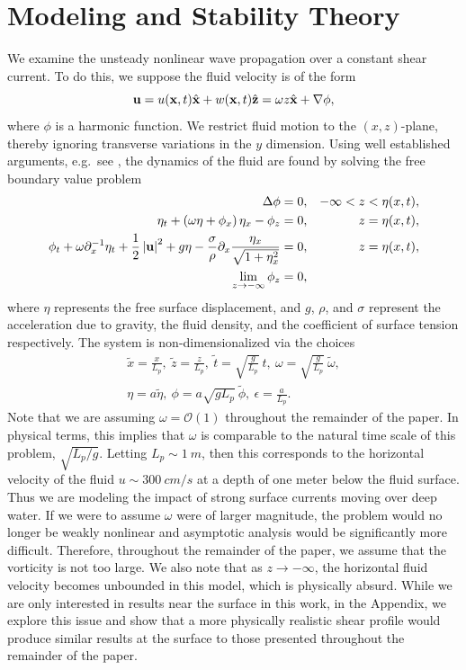 \documentclass[a4paper,11pt]{article}
\newcommand{\pd}{\partial}
\begin{document}
\section{Modeling and Stability Theory}
We examine the unsteady nonlinear wave propagation over a constant shear current.  To do this, we suppose the fluid velocity is of the form
\[
{\bf u} = u({\bf x},t)\hat{{\bf x}} + w({\bf x},t)\hat{{\bf z}} = \omega z\hat{{\bf x}} + \nabla \phi,
\]
where $\phi$ is a harmonic function.  We restrict fluid motion to the $(x,z)$-plane, thereby ignoring transverse variations in the $y$ dimension.   Using well established arguments, e.g.~see \cite{ashton}, the dynamics of the fluid are found by solving the free boundary value problem
\begin{align}
\Delta \phi = 0, & & -\infty< z < \eta(x,t), \nonumber \\
\eta_{t} +\left(\omega\eta+\phi_{x}\right)\eta_{x} - \phi_{z} = 0, & & z=\eta(x,t), \label{kine}\\
\phi_{t} + \omega\pd_{x}^{-1}\eta_{t} + \frac{1}{2} \left|{\bf
    u}\right|^{2} + g\eta -
\frac{\sigma}{\rho}\pd_{x}\frac{\eta_{x}}{\sqrt{1+\eta_{x}^{2}}}= 0, &
& z=\eta(x,t), \label{bernou}\\
\lim_{z\rightarrow -\infty} \phi_{z} = 0, \nonumber
\end{align}
where $\eta$ represents the free surface displacement, and $g$, $\rho$, and $\sigma$ represent the acceleration due to gravity, the fluid density, and the coefficient of surface tension respectively.  The system is non-dimensionalized via the choices 
\begin{align*}
\tilde{x} = \frac{x}{L_{p}}, ~\tilde{z} = \frac{z}{L_{p}}, ~ \tilde{t} = \sqrt{\frac{g}{L_{p}}}~t, ~\omega = \sqrt{\frac{g}{L_{p}}}~\tilde{\omega}, \\
\eta = a \tilde{\eta}, ~ \phi  = a\sqrt{gL_{p}}~\tilde{\phi} , ~ \epsilon = \frac{a}{L_{p}}.
\end{align*}
Note that we are assuming $\omega = \mathcal{O}(1)$ throughout the remainder of the paper.  In physical terms, this implies that $\omega$ is comparable to the natural time scale of this problem, $\sqrt{L_{p}/g}$.  Letting $L_{p}\sim 1~m$, then this corresponds to the horizontal velocity of the fluid $u \sim 300 ~cm/s$ at a depth of one meter below the fluid surface.  Thus we are modeling the impact of strong surface currents moving over deep water.  If we were to assume $\omega$ were of larger magnitude, the problem would no longer be weakly nonlinear and asymptotic analysis would be significantly more difficult.  Therefore, throughout the remainder of the paper, we assume that the vorticity is not too large.  We also note that as $z\rightarrow -\infty$, the horizontal fluid velocity becomes unbounded in this model, which is physically absurd.  While we are only interested in results near the surface in this work, in the Appendix, we explore this issue and show that a more physically realistic shear profile would produce similar results at the surface to those presented throughout the remainder of the paper.  
\end{document}
